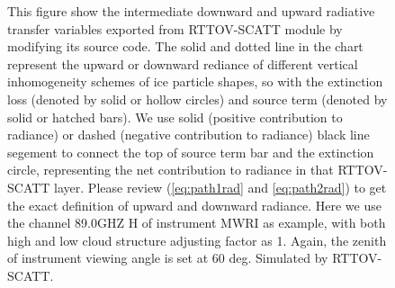 \begin{figure}[hbtp] 
\centering
{}
\caption{This figure show the intermediate downward and upward radiative transfer variables 
exported from RTTOV-SCATT module by modifying its source code. 
The solid and dotted line in the chart represent the upward or downward rediance 
of different vertical inhomogeneity schemes of ice particle shapes, so with the extinction loss (denoted by solid or hollow circles)
and source term (denoted by solid or hatched bars).
We use solid (positive contribution to radiance) or dashed (negative contribution to radiance) black line segement 
to connect the top of source term bar and the extinction circle, representing the net contribution to radiance in that
RTTOV-SCATT layer. 
Please review (\ref{eq:path1rad} and \ref{eq:path2rad}) to get the exact definition of upward and downward radiance. 
Here we use the channel 89.0GHZ H of instrument MWRI as example, with both high and low cloud structure
adjusting factor as 1. Again, the zenith of instrument viewing angle is set at 60 deg. 
Simulated by RTTOV-SCATT.}
\label{fig:exrad}
\end{figure}

\clearpage
